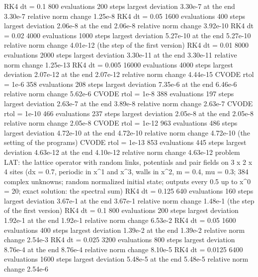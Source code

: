 \documentclass[
  10pt,
]{article}
\newenvironment{Shaded}{}{}
\newcommand{\NormalTok}[1]{#1}
\begin{document}
\begin{Shaded}
\begin{Highlighting}[]
\NormalTok{  RK4   dt = 0.1           800 evaluations     200 steps  largest deviation 3.30e{-}7  at the end 3.30e{-}7  relative norm change 1.25e{-}8}
\NormalTok{  RK4   dt = 0.05         1600 evaluations     400 steps  largest deviation 2.06e{-}8  at the end 2.06e{-}8  relative norm change 3.92e{-}10}
\NormalTok{  RK4   dt = 0.02         4000 evaluations    1000 steps  largest deviation 5.27e{-}10  at the end 5.27e{-}10  relative norm change 4.01e{-}12  (the step of the first version)}
\NormalTok{  RK4   dt = 0.01         8000 evaluations    2000 steps  largest deviation 3.30e{-}11  at the end 3.30e{-}11  relative norm change 1.25e{-}13}
\NormalTok{  RK4   dt = 0.005       16000 evaluations    4000 steps  largest deviation 2.07e{-}12  at the end 2.07e{-}12  relative norm change 4.44e{-}15}
\NormalTok{  CVODE rtol = 1e{-}6        358 evaluations     208 steps  largest deviation 7.35e{-}6  at the end 6.46e{-}6  relative norm change 5.62e{-}6}
\NormalTok{  CVODE rtol = 1e{-}8        388 evaluations     197 steps  largest deviation 2.63e{-}7  at the end 3.89e{-}8  relative norm change 2.63e{-}7}
\NormalTok{  CVODE rtol = 1e{-}10       466 evaluations     237 steps  largest deviation 2.05e{-}8  at the end 2.05e{-}8  relative norm change 2.05e{-}8}
\NormalTok{  CVODE rtol = 1e{-}12       963 evaluations     486 steps  largest deviation 4.72e{-}10  at the end 4.72e{-}10  relative norm change 4.72e{-}10  (the setting of the programs)}
\NormalTok{  CVODE rtol = 1e{-}13       853 evaluations     445 steps  largest deviation 4.63e{-}12  at the end 4.10e{-}12  relative norm change 4.63e{-}12}
\NormalTok{problem LAT: the lattice operator with random links, potentials and pair fields on 3 x 2 x 4 sites (dx = 0.7, periodic in x\^{}1 and x\^{}3, walls in x\^{}2, m = 0.4, mu = 0.3; 384 complex unknowns; random normalized initial state; outputs every 0.5 up to x\^{}0 = 20; exact solution: the spectral sum)}
\NormalTok{  RK4   dt = 0.125         640 evaluations     160 steps  largest deviation 3.67e{-}1  at the end 3.67e{-}1  relative norm change 1.48e{-}1  (the step of the first version)}
\NormalTok{  RK4   dt = 0.1           800 evaluations     200 steps  largest deviation 1.92e{-}1  at the end 1.92e{-}1  relative norm change 6.53e{-}2}
\NormalTok{  RK4   dt = 0.05         1600 evaluations     400 steps  largest deviation 1.39e{-}2  at the end 1.39e{-}2  relative norm change 2.54e{-}3}
\NormalTok{  RK4   dt = 0.025        3200 evaluations     800 steps  largest deviation 8.76e{-}4  at the end 8.76e{-}4  relative norm change 8.10e{-}5}
\NormalTok{  RK4   dt = 0.0125       6400 evaluations    1600 steps  largest deviation 5.48e{-}5  at the end 5.48e{-}5  relative norm change 2.54e{-}6}

\end{Highlighting}
\end{Shaded}
\end{document}
